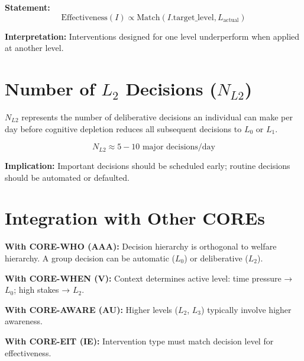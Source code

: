 \begin{tcolorbox}[colback=gray!5!white, colframe=gray!75!black,
    title=Axiom UNMAPPED_HIE-4: Level-Intervention Match]
\textbf{Statement:}
\begin{equation}
\text{Effectiveness}(I) \propto \text{Match}(I.\text{target\_level}, L_{\text{actual}})
\end{equation}

\textbf{Interpretation:} Interventions designed for one level underperform when
applied at another level.
\end{tcolorbox}

\section{Number of $L_2$ Decisions ($N_{L2}$)}
\label{sec:hier-NL2}

\begin{definition}[$N_{L2}$ Capacity]
$N_{L2}$ represents the number of deliberative decisions an individual can make
per day before cognitive depletion reduces all subsequent decisions to $L_0$ or $L_1$.
\end{definition}

\begin{equation}
N_{L2} \approx 5-10 \text{ major decisions/day}
\end{equation}

\textbf{Implication:} Important decisions should be scheduled early;
routine decisions should be automated or defaulted.

\section{Integration with Other COREs}

\begin{tcolorbox}[colback=yellow!5!white, colframe=yellow!75!black,
    title=Integration: CORE-HIERARCHY $\leftrightarrow$ Other COREs]
\textbf{With CORE-WHO (AAA):}
Decision hierarchy is orthogonal to welfare hierarchy. A group decision can be
automatic ($L_0$) or deliberative ($L_2$).

\textbf{With CORE-WHEN (V):}
Context determines active level: time pressure → $L_0$; high stakes → $L_2$.

\textbf{With CORE-AWARE (AU):}
Higher levels ($L_2$, $L_3$) typically involve higher awareness.

\textbf{With CORE-EIT (IE):}
Intervention type must match decision level for effectiveness.
\end{tcolorbox}

